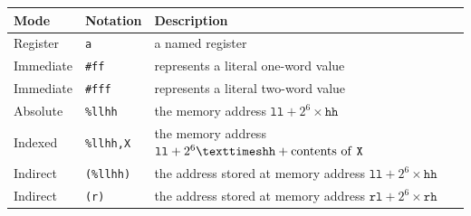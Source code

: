 \documentclass[a4paper,onecolumn,final,10pt]{memoir}
\let\ttt\texttt
\begin{document}

\begin{center}
	\begin{tabular}{|l|l|l|}
		\hline
		\textbf{Mode} & \textbf{Notation}                       & \textbf{Description}                                                    \\ \hline
		Register      & \ttt{a}                               & a named register                                                        \\ \hline
		Immediate     & \ttt{\#ff}                              & represents a literal one-word value                                     \\ \hline
		Immediate     & \ttt{\#fff}                             & represents a literal two-word value                                     \\ \hline
		Absolute      & \ttt{\%llhh}                            & the memory address $\ttt{ll}+2^6×\ttt{hh}$                              \\ \hline
		Indexed       & \ttt{\%llhh,X}                          & the memory address $\ttt{ll}+2^6×\ttt{hh}+\textrm{contents of \ttt{X}}$ \\ \hline
		Indirect      & \hspace{-0.2em}\ttt{(\%llhh)}           & the address stored at memory address $\ttt{ll}+2^6×\ttt{hh}$            \\ \hline
		Indirect      & \hspace{-0.2em}\ttt{(r)}\footnotemark & the address stored at memory address $\ttt{rl}+2^6×\ttt{rh}$            \\ \hline
	\end{tabular}
\end{center}
\end{document}
